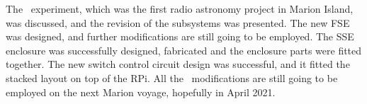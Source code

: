The \prizm\ experiment, which was the first radio astronomy project in Marion Island, was discussed, and the revision of the subsystems was presented. The new FSE was designed, and further modifications are still going to be employed. The SSE enclosure was successfully designed, fabricated and the enclosure parts were fitted together. The new switch control circuit design was successful, and it fitted the stacked layout on top of the RPi. All the \prizm\ modifications are still going to be employed on the next Marion voyage, hopefully in April 2021. 
